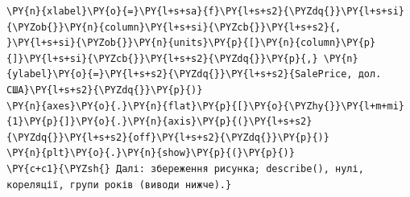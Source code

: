 \begin{Verbatim}[commandchars=\\\{\}]
           \PY{n}{xlabel}\PY{o}{=}\PY{l+s+sa}{f}\PY{l+s+s2}{\PYZdq{}}\PY{l+s+si}{\PYZob{}}\PY{n}{column}\PY{l+s+si}{\PYZcb{}}\PY{l+s+s2}{, }\PY{l+s+si}{\PYZob{}}\PY{n}{units}\PY{p}{[}\PY{n}{column}\PY{p}{]}\PY{l+s+si}{\PYZcb{}}\PY{l+s+s2}{\PYZdq{}}\PY{p}{,} \PY{n}{ylabel}\PY{o}{=}\PY{l+s+s2}{\PYZdq{}}\PY{l+s+s2}{SalePrice, дол. США}\PY{l+s+s2}{\PYZdq{}}\PY{p}{)}
\PY{n}{axes}\PY{o}{.}\PY{n}{flat}\PY{p}{[}\PY{o}{\PYZhy{}}\PY{l+m+mi}{1}\PY{p}{]}\PY{o}{.}\PY{n}{axis}\PY{p}{(}\PY{l+s+s2}{\PYZdq{}}\PY{l+s+s2}{off}\PY{l+s+s2}{\PYZdq{}}\PY{p}{)}
\PY{n}{plt}\PY{o}{.}\PY{n}{show}\PY{p}{(}\PY{p}{)}
\PY{c+c1}{\PYZsh{} Далі: збереження рисунка; describe(), нулі, кореляції, групи років (виводи нижче).}
\end{Verbatim}
